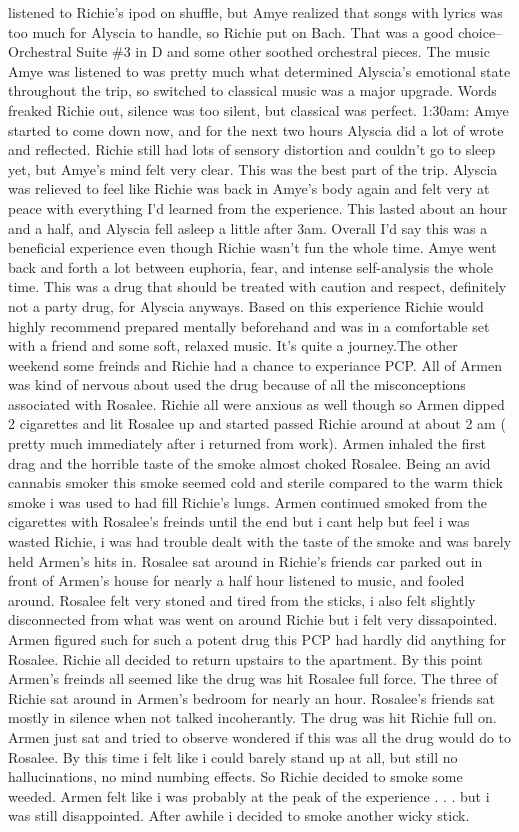 \documentclass[12pt]{book}
\begin{document}
listened to Richie's ipod on shuffle, but Amye realized that songs with lyrics was too much for Alyscia to handle, so Richie put on Bach. That was a good choice--Orchestral Suite \#3 in D and some other soothed orchestral pieces. The music Amye was listened to was pretty much what determined Alyscia's emotional state throughout the trip, so switched to classical music was a major upgrade. Words freaked Richie out, silence was too silent, but classical was perfect. 1:30am: Amye started to come down now, and for the next two hours Alyscia did a lot of wrote and reflected. Richie still had lots of sensory distortion and couldn't go to sleep yet, but Amye's mind felt very clear. This was the best part of the trip. Alyscia was relieved to feel like Richie was back in Amye's body again and felt very at peace with everything I'd learned from the experience. This lasted about an hour and a half, and Alyscia fell asleep a little after 3am. Overall I'd say this was a beneficial experience even though Richie wasn't fun the whole time. Amye went back and forth a lot between euphoria, fear, and intense self-analysis the whole time. This was a drug that should be treated with caution and respect, definitely not a party drug, for Alyscia anyways. Based on this experience Richie would highly recommend prepared mentally beforehand and was in a comfortable set with a friend and some soft, relaxed music. It's quite a journey.The other weekend some freinds and Richie had a chance to experiance PCP. All of Armen was kind of nervous about used the drug because of all the misconceptions associated with Rosalee. Richie all were anxious as well though so Armen dipped 2 cigarettes and lit Rosalee up and started passed Richie around at about 2 am (  pretty much immediately after i returned from work). Armen inhaled the first drag and the horrible taste of the smoke almost choked Rosalee. Being an avid cannabis smoker this smoke seemed cold and sterile compared to the warm thick smoke i was used to had fill Richie's lungs. Armen continued smoked from the cigarettes with Rosalee's freinds until the end but i cant help but feel i was wasted Richie, i was had trouble dealt with the taste of the smoke and was barely held Armen's hits in. Rosalee sat around in Richie's friends car parked out in front of Armen's house for nearly a half hour listened to music, and fooled around. Rosalee felt very stoned and tired from the sticks, i also felt slightly disconnected from what was went on around Richie but i felt very dissapointed. Armen figured such for such a potent drug this PCP had hardly did anything for Rosalee. Richie all decided to return upstairs to the apartment. By this point Armen's freinds all seemed like the drug was hit Rosalee full force. The three of Richie sat around in Armen's bedroom for nearly an hour. Rosalee's friends sat mostly in silence when not talked incoherantly. The drug was hit Richie full on. Armen just sat and tried to observe wondered if this was all the drug would do to Rosalee. By this time i felt like i could barely stand up at all, but still no hallucinations, no mind numbing effects. So Richie decided to smoke some weeded. Armen felt like i was probably at the peak of the experience . . .  but i was still disappointed. After awhile i decided to smoke another wicky stick. 
\end{document}
